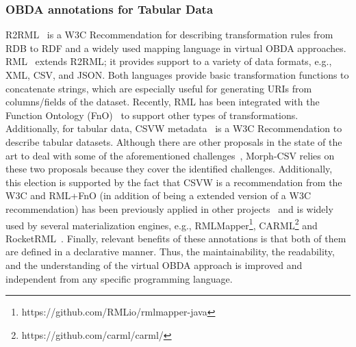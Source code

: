 \subsubsection{OBDA annotations for Tabular Data}
R2RML~\citep{R2RML} is a W3C Recommendation for describing transformation rules from RDB to RDF and a widely used mapping language in virtual OBDA approaches. RML~\citep{dimou2014rml} extends R2RML; it provides support to a variety of data formats, e.g., XML, CSV, and JSON. Both languages provide basic transformation functions to concatenate strings, which are especially useful for generating URIs from columns/fields of the dataset. Recently, RML has been integrated with the Function Ontology (FnO)~\citep{de2016ontology} to support other types of transformations. Additionally, for tabular data, CSVW metadata~\citep{tennison2015model} is a W3C Recommendation to describe tabular datasets. Although there are other proposals in the state of the art to deal with some of the aforementioned challenges~\citep{junior2016funul,debruyne2016r2rml}, Morph-CSV relies on these two proposals because they cover the identified challenges. Additionally, this election is supported by the fact that CSVW is a recommendation from the W3C and RML+FnO (in addition of being a extended version of a W3C recommendation) has been previously applied in other projects~\citep{de2017declarative,mami2019squerall} and is widely used by several materialization engines, e.g.,  RMLMapper\footnote{https://github.com/RMLio/rmlmapper-java}, CARML\footnote{https://github.com/carml/carml/} and RocketRML~\citep{csimcsek2019rocketrml}. Finally, relevant benefits of these annotations is that both of them are defined in a declarative manner. Thus, the maintainability, the readability, and the understanding of the virtual OBDA approach is improved and independent from any specific programming language.

